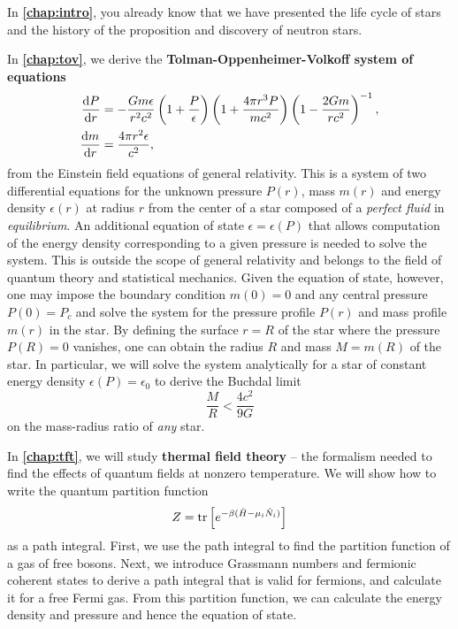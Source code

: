 In \textbf{\cref{chap:intro}}, you already know that we have presented the life cycle of stars and the history of the proposition and discovery of neutron stars.

In \textbf{\cref{chap:tov}}, we derive the \textbf{Tolman-Oppenheimer-Volkoff system of equations}
\begin{align*}
	\odv{P}{r} &= -\frac{G m \epsilon}{r^2 c^2} \left( 1 + \frac{P}{\epsilon} \right) \left( 1 + \frac{4 \pi r^3 P}{m c^2} \right) \left( 1 - \frac{2 G m}{r c^2} \right)^{-1} , \\
	\odv{m}{r} &= \frac{4 \pi r^2 \epsilon}{c^2} ,
\end{align*}
from the Einstein field equations of general relativity.
This is a system of two differential equations for the unknown pressure $P(r)$, mass $m(r)$ and energy density $\epsilon(r)$ at radius $r$ from the center of a star composed of a \emph{perfect fluid} in \emph{equilibrium}.
An additional equation of state $\epsilon = \epsilon(P)$ that allows computation of the energy density corresponding to a given pressure is needed to solve the system.
This is outside the scope of general relativity and belongs to the field of quantum theory and statistical mechanics.
Given the equation of state, however, one may impose the boundary condition $m(0) = 0$ and any central pressure $P(0) = P_c$ and solve the system for the pressure profile $P(r)$ and mass profile $m(r)$ in the star.
By defining the surface $r=R$ of the star where the pressure $P(R) = 0$ vanishes, one can obtain the radius $R$ and mass $M = m(R)$ of the star.
In particular, we will solve the system analytically for a star of constant energy density $\epsilon(P) = \epsilon_0$ to derive the Buchdal limit
\begin{equation*}
	\frac{M}{R} < \frac{4 c^2}{9 G}
\end{equation*}
on the mass-radius ratio of \emph{any} star.

In \textbf{\cref{chap:tft}}, we will study \textbf{thermal field theory} -- the formalism needed to find the effects of quantum fields at nonzero temperature.
We will show how to write the quantum partition function
\begin{equation*}
	Z = \text{tr} \left[ e^{-\beta(\hat{H} - \mu_i \hat{N}_i)} \right]
\end{equation*}
as a path integral.
First, we use the path integral to find the partition function of a gas of free bosons.
Next, we introduce Grassmann numbers and fermionic coherent states to derive a path integral that is valid for fermions, and calculate it for a free Fermi gas.
From this partition function, we can calculate the energy density and pressure and hence the equation of state.

